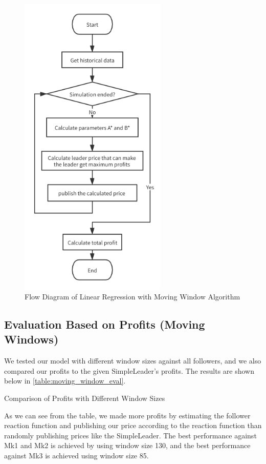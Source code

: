 \documentclass[a4paper]{article}
\begin{document}
\begin{figure}[H]
  \centering
  \includegraphics[width=7cm]{moving-window}
  \caption{Flow Diagram of Linear Regression with Moving Window Algorithm}%
  \label{fig:moving-window}
\end{figure}

\subsection{Evaluation Based on Profits (Moving Windows)}
We tested our model with different window sizes against all followers, and we
also compared our profits to the given SimpleLeader's profits.
The results are shown below in \cref{table:moving_window_eval}.

\begin{table}[H]
  \centering
  
  \caption{Comparison of Profits with Different Window Sizes}%
  \label{table:moving_window_eval}
\end{table}

As we can see from the table, we made more profits by estimating the follower
reaction function and publishing our price according to the reaction function
than randomly publishing prices like the SimpleLeader.
The best performance against Mk1 and Mk2 is achieved by using window size 130,
and the best performance against Mk3 is achieved using window size 85.
\end{document}
